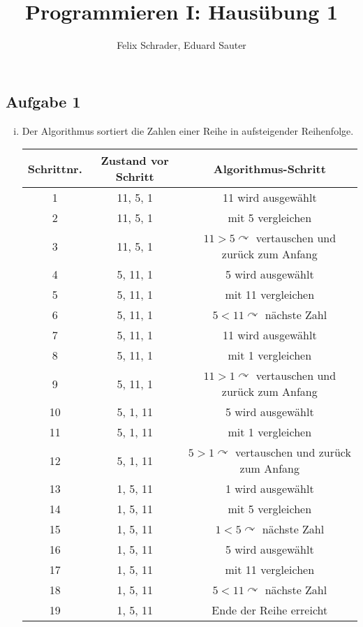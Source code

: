 \documentclass[11pt]{article}
\author{Felix Schrader, Eduard Sauter}
\title{Programmieren I: Haus\"ubung 1}
\begin{document}
\subsection*{Aufgabe 1}
\begin{enumerate}[i)]

  \item Der Algorithmus sortiert die Zahlen einer Reihe in aufsteigender
    Reihenfolge.

    \begin{table}[h!]
      \centering
      \begin{tabular}{|c|c|c|}
        \hline 
        Schrittnr. & Zustand vor Schritt & Algorithmus-Schritt \\ 
        \hline 
        1 & 11, 5, 1 & 11 wird ausgew\"ahlt \\ 
        \hline 
        2 & 11, 5, 1 & mit 5 vergleichen \\ 
        \hline 
        3 & 11, 5, 1 & $11>5\curvearrowright$ vertauschen und zur\"uck zum Anfang \\ 
        \hline 
        4 & 5, 11, 1 & 5 wird ausgew\"ahlt \\ 
        \hline 
        5 & 5, 11, 1 & mit 11 vergleichen \\ 
        \hline 
        6 & 5, 11, 1 & $5<11\curvearrowright$ n\"achste Zahl \\ 
        \hline 
        7 & 5, 11, 1 & 11 wird ausgew\"ahlt \\ 
        \hline 
        8 & 5, 11, 1 & mit 1 vergleichen \\ 
        \hline 
        9 & 5, 11, 1 & $11>1\curvearrowright$ vertauschen und zur\"uck zum Anfang \\ 
        \hline 
        10 & 5, 1, 11 & 5 wird ausgew\"ahlt \\ 
        \hline 
        11 & 5, 1, 11 & mit 1 vergleichen \\ 
        \hline 
        12 & 5, 1, 11 & $5>1\curvearrowright$ vertauschen und zur\"uck zum Anfang \\ 
        \hline 
        13 & 1, 5, 11 & 1 wird ausgew\"ahlt \\ 
        \hline 
        14 & 1, 5, 11 & mit 5 vergleichen \\ 
        \hline 
        15 & 1, 5, 11 & $1<5\curvearrowright$ n\"achste Zahl \\ 
        \hline 
        16 & 1, 5, 11 & 5 wird ausgew\"ahlt \\ 
        \hline 
        17 & 1, 5, 11 & mit 11 vergleichen \\ 
        \hline 
        18 & 1, 5, 11 & $5<11\curvearrowright$ n\"achste Zahl \\ 
        \hline 
        19 & 1, 5, 11 & Ende der Reihe erreicht \\ 
        \hline 
      \end{tabular} 
    \end{table}


\end{enumerate}
\end{document}
